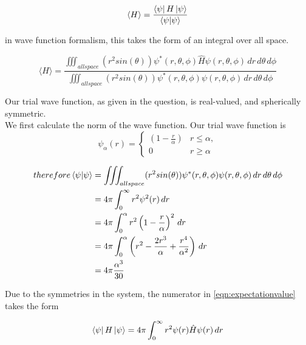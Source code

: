     \begin{equation*}
        \langle H \rangle = \frac{\bra{\psi}H\ket{\psi}}{\braket{\psi}{\psi}}
    \end{equation*}

    in wave function formalism, this takes the form of an integral over all space.

    \begin{equation}
        \label{eqn:expectationvalue}
        \langle H \rangle = \frac{\iiint_{all space} (r^{2}sin(\theta))\psi^{*}(r,\theta,\phi)\hat{H}\psi(r,\theta,\phi) \,dr\,d\theta\,d\phi}{\iiint_{all space} (r^{2}sin(\theta))\psi^{*}(r,\theta,\phi)\psi(r,\theta,\phi) \,dr\,d\theta\,d\phi}
    \end{equation}

    Our trial wave function, as given in the question, is real-valued, and spherically symmetric. \\
    We first calculate the norm of the wave function. Our trial wave function is
    \begin{equation*}
        \psi_{\alpha}(r) = 
        \begin{cases}
            \left( 1 - \frac{r}{\alpha}\right) & r \leqslant \alpha, \\
            0 & r \geqslant \alpha 
        \end{cases}
    \end{equation*}

    \begin{equation*}
    \begin{split}
        therefore \braket{\psi}{\psi} & = \iiint_{all space} (r^{2}sin(\theta))\psi^{*}(r,\theta,\phi)\psi(r,\theta,\phi) \,dr\,d\theta\,d\phi \\
        & = 4\pi \int_{0}^{\infty} r^{2} \psi^{2}(r)\,dr \\
        & = 4\pi \int_{0}^{\alpha} r^{2}\left( 1 - \frac{r}{\alpha}\right)^{2}\,dr \\
        & = 4\pi \int_{0}^{\alpha} \left( r^2 - \frac{2r^3}{\alpha} + \frac{r^4}{\alpha^2} \right)\,dr \\
        & = 4\pi \frac{\alpha^3}{30}
    \end{split}
    \end{equation*}
    
    Due to the symmetries in the system, the numerator in \ref{eqn:expectationvalue} takes the form

    \begin{equation*}
        \bra{\psi}H\ket{\psi} = 4\pi \int_{0}^{\infty} r^{2} \psi(r)\hat{H}\psi(r)\,dr
    \end{equation*}

